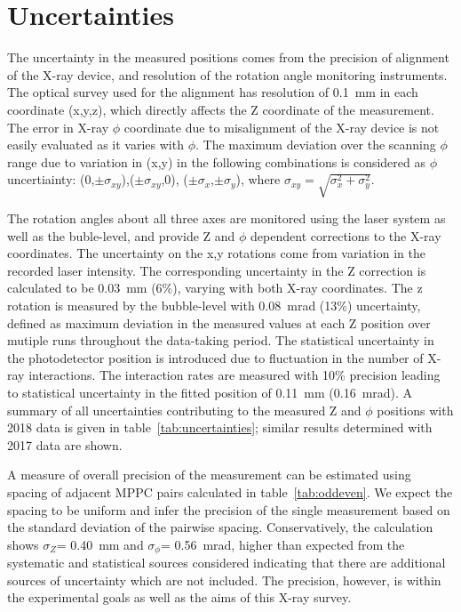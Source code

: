 \section{Uncertainties}
The uncertainty in the measured positions comes from the
precision of alignment of the X-ray device, and resolution of the
rotation angle monitoring instruments. The optical survey used
for the alignment has resolution of 0.1~mm in each coordinate
(x,y,z), which directly affects the Z coordinate of the
measurement. The error in X-ray $\phi$ coordinate due to
misalignment of the X-ray device is not easily evaluated as it
varies with $\phi$.  The maximum deviation over the scanning
$\phi$ range due to variation in (x,y) in the following
combinations is  considered as $\phi$ uncertiainty:
(0,$\pm\sigma_{xy}$),($\pm\sigma_{xy}$,0),
($\pm\sigma_{x}$,$\pm\sigma_{y}$), where $\sigma_{xy} =
\sqrt{\sigma_{x}^{2}+\sigma_{y}^2}$.

The rotation angles about all three axes are monitored using the
laser system as well as the buble-level, and provide Z and $\phi$
dependent corrections to the X-ray coordinates.  The uncertainty
on the x,y rotations come from variation in the recorded laser
intensity.  The corresponding uncertainty in the Z correction is
calculated to be 0.03~mm (6\%), varying with both X-ray
coordinates.  The z rotation is measured by the bubble-level with
0.08~mrad (13\%) uncertainty, defined as maximum deviation in the
measured values at each Z position  over mutiple runs throughout
the data-taking period.  The statistical uncertainty in the
photodetector position is introduced due to fluctuation in the
number of X-ray interactions. The interaction rates are measured
with 10\% precision leading to statistical uncertainty in the
fitted position of  0.11~mm (0.16~mrad).  A summary of all
uncertainties contributing to the measured Z and $\phi$ positions
with 2018 data is given in table~\ref{tab:uncertainties}; similar
results determined with 2017 data are shown.

A measure of overall precision of the measurement can be
estimated using spacing of adjacent MPPC pairs calculated in
table~\ref{tab:oddeven}.  We expect the spacing to be uniform and
infer the precision of the single measurement based on the
standard deviation of the pairwise spacing. Conservatively, the
calculation shows $\sigma_Z$= 0.40~mm and $\sigma_\phi$=
0.56~mrad, higher than expected from the systematic and
statistical sources considered indicating that there are
additional sources of uncertainty which are not included. The
precision, however, is within the experimental goals as well as
the aims of this X-ray survey.

